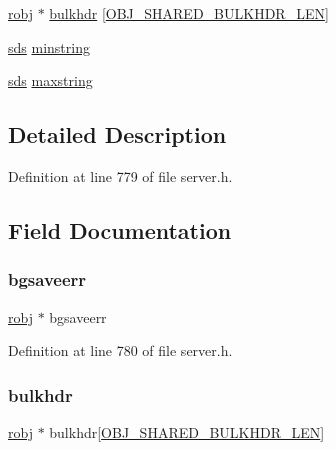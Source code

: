 \begin{DoxyCompactItemize}
\item 
\hyperlink{server_8h_a540f174d2685422fbd7d12e3cd44c8e2}{robj} $\ast$ \hyperlink{structshared_objects_struct_aad9ef4e12438584f8b4a1ea055ba1d9c}{bulkhdr} \mbox{[}\hyperlink{server_8h_aff2f6e62c729d3f8b119d761818be317}{O\+B\+J\+\_\+\+S\+H\+A\+R\+E\+D\+\_\+\+B\+U\+L\+K\+H\+D\+R\+\_\+\+L\+EN}\mbox{]}
\item 
\hyperlink{sds_8h_ad69abac3df4532879db9642c95f5ef6f}{sds} \hyperlink{structshared_objects_struct_a5d1b090719486b6cba969aa7f76fcf8e}{minstring}
\item 
\hyperlink{sds_8h_ad69abac3df4532879db9642c95f5ef6f}{sds} \hyperlink{structshared_objects_struct_a9ec2b071c9af3042098b878026d9c3dd}{maxstring}
\end{DoxyCompactItemize}


\subsection{Detailed Description}


Definition at line 779 of file server.\+h.



\subsection{Field Documentation}
\mbox{\label{structshared_objects_struct_a8e60666fa4a7bb1814cfc4734c9504d9}} 
\subsubsection{\texorpdfstring{bgsaveerr}{bgsaveerr}}
{\footnotesize\ttfamily \hyperlink{server_8h_a540f174d2685422fbd7d12e3cd44c8e2}{robj} $\ast$ bgsaveerr}



Definition at line 780 of file server.\+h.

\mbox{\label{structshared_objects_struct_aad9ef4e12438584f8b4a1ea055ba1d9c}} 
\subsubsection{\texorpdfstring{bulkhdr}{bulkhdr}}
{\footnotesize\ttfamily \hyperlink{server_8h_a540f174d2685422fbd7d12e3cd44c8e2}{robj} $\ast$ bulkhdr\mbox{[}\hyperlink{server_8h_aff2f6e62c729d3f8b119d761818be317}{O\+B\+J\+\_\+\+S\+H\+A\+R\+E\+D\+\_\+\+B\+U\+L\+K\+H\+D\+R\+\_\+\+L\+EN}\mbox{]}}



